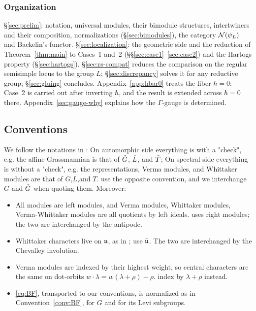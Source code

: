 \documentclass{article}
\theoremstyle{plain}
\theoremstyle{definition}
\theoremstyle{remark}
\numberwithin{equation}{section}
\begin{document}
\subsubsection*{Organization}
\S\ref{sec:prelim}: notation, universal modules, their bimodule structures, intertwiners and their composition, normalizations (\S\ref{sec:bimodules}), the category $\mathcal{N}(\psi_L)$ and Backelin's functor. \S\ref{sec:localization}: the geometric side and the reduction of Theorem~\ref{thm:main} to Cases~1 and~2 (\S\S\ref{sec:case1}--\ref{sec:case2}) and the Hartogs property (\S\ref{sec:hartogs}). \S\ref{sec:rs-compat} reduces the comparison on the regular semisimple locus to the group $L$; \S\ref{sec:discrepancy} solves it for any reductive group; \S\ref{sec:gluing} concludes. Appendix~\ref{app:hbar0} treats the fiber $\hbar=0$: Case~2 is carried out after inverting $\hbar$, and the result is extended across $\hbar=0$ there. Appendix~\ref{sec:gauge-why} explains how the $\Gamma$-gauge is determined.

\subsection{Conventions}\label{sec:conventions}
We follow the notations in \cite{ginzburg2014differentialoperatorsguaffine}: On automorphic side everything is with a "check", e.g. the affine Grassmannian is that of ${\check{G}}$, $\check{L}$, and ${\check{T}}$; On spectral side everything is without a "check", e.g. the representations, Verma modules, and Whittaker modules are that of $G$,$L$,and $T$. \cite{bezrukavnikov2026equivariantsatakecategorykostantwhittaker,macerato2023leviequivariantrestrictionsphericalperverse} use the opposite convention, and we interchange $G$ and ${\check{G}}$ when quoting them. Moreover:
\begin{itemize}
\item All modules are left modules, and Verma modules, Whittaker modules, Verma-Whittaker modules are all quotients by left ideals. \cite{ginzburg2014differentialoperatorsguaffine} uses right modules; the two are interchanged by the antipode.
\item Whittaker characters live on $\mathfrak{u}$, as in \cite{Milicic1997,MCDOWELL1985161,Backelinfunctor,eberhardt2024proofsjantzenconjecturewhittaker,macerato2023leviequivariantrestrictionsphericalperverse}; \cite{bezrukavnikov2026equivariantsatakecategorykostantwhittaker,ginzburg2022differentialoperatorsgugelfandgraev} use $\bar{\mathfrak{u}}$. The two are interchanged by the Chevalley involution.
\item Verma modules are indexed by their highest weight, so central characters are the same on dot-orbits $w\cdot\lambda=w(\lambda+\rho)-\rho$. \cite{Milicic1997,MCDOWELL1985161,eberhardt2024proofsjantzenconjecturewhittaker} index by $\lambda+\rho$ instead.
\item \eqref{eq:BF}, transported to our conventions, is normalized as in Convention~\ref{conv:BF}, for $G$ and for its Levi subgroups.
\end{itemize}
\end{document}
